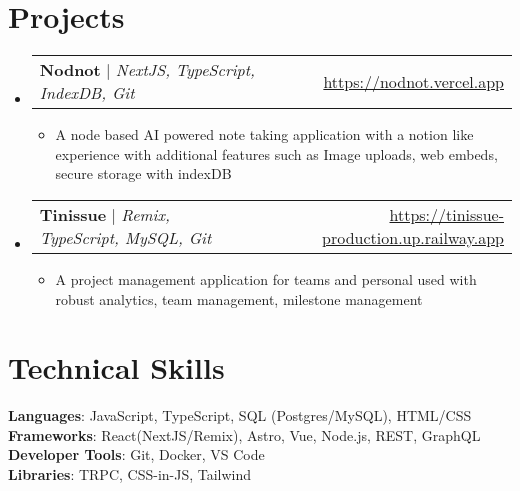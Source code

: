 \documentclass[letterpaper,11pt]{article}
\makeatletter
\newcommand{\resumeItem}[1]{
  \item\small{
    {#1 \vspace{-2pt}}
  }
}
\newcommand{\resumeProjectHeading}[2]{
    \item
    \begin{tabular*}{0.97\textwidth}{l@{\extracolsep{\fill}}r}
      \small#1 & #2 \\
    \end{tabular*}\vspace{-7pt}
}
\newcommand{\resumeSubHeadingListStart}{\begin{itemize}[leftmargin=0.15in, label={}]}
\newcommand{\resumeSubHeadingListEnd}{\end{itemize}}
\newcommand{\resumeItemListStart}{\begin{itemize}}
\newcommand{\resumeItemListEnd}{\end{itemize}\vspace{-5pt}}
\makeatother
\begin{document}
\section{Projects}
    \resumeSubHeadingListStart
      \resumeProjectHeading
          {\textbf{Nodnot} $|$ \emph{NextJS, TypeScript, IndexDB, Git}}{\url{https://nodnot.vercel.app}}
          \resumeItemListStart
            \resumeItem{A node based AI powered note taking application with a notion like experience with additional features such as Image uploads, web embeds, secure storage with indexDB}
          \resumeItemListEnd
      \resumeProjectHeading
          {\textbf{Tinissue} $|$ \emph{Remix, TypeScript, MySQL, Git}}{\url{https://tinissue-production.up.railway.app}}
          \resumeItemListStart
            \resumeItem{A project management application for teams and personal used with robust analytics, team management, milestone management}
          \resumeItemListEnd
    \resumeSubHeadingListEnd



\section{Technical Skills}
 \begin{itemize}[leftmargin=0.15in, label={}]
    \small{\item{
     \textbf{Languages}{: JavaScript, TypeScript, SQL (Postgres/MySQL), HTML/CSS} \\
     \textbf{Frameworks}{: React(NextJS/Remix), Astro, Vue, Node.js, REST, GraphQL} \\
     \textbf{Developer Tools}{: Git, Docker, VS Code} \\
     \textbf{Libraries}{: TRPC, CSS-in-JS, Tailwind}
    }}
 \end{itemize}


\end{document}
